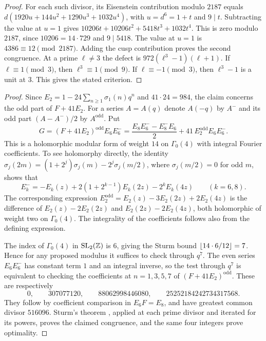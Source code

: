 \begin{proof}
For each such divisor, its Eisenstein contribution modulo $2187$ equals
$d(1920u+144u^2+1290u^3+1032u^4)$, with $u=d^6=1+t$ and $9\mid t$. Subtracting the value at
$u=1$ gives $10206t+10206t^2+5418t^3+1032t^4$. This is zero modulo $2187$, since
$10206=14\cdot729$ and $9\mid5418$. The value at $u=1$ is $4386\equiv12\pmod{2187}$.
Adding the cusp contribution proves the second congruence. At a prime $\ell\ne3$ the defect
is $972(\ell^3-1)(\ell+1)$. If $\ell\equiv1\pmod3$, then $\ell^3\equiv1\pmod9$. If
$\ell\equiv-1\pmod3$, then $\ell^3-1$ is a unit at $3$. This gives the stated criterion.
\end{proof}


\begin{proof}
Since $E_2=1-24\sum_{n\ge1}\sigma_1(n)q^n$ and $41\cdot24=984$, the claim concerns the odd
part of $F+41E_2$. For a series $A=A(q)$ denote $A(-q)$ by $A^-$ and its odd part $(A-A^-)/2$ by
$A^{\mathrm{odd}}$. Put
\[
 G=(F+41E_2)^{\mathrm{odd}}E_6E_6^-
 =\frac{E_8E_6^--E_8^-E_6}{2}+41\,E_2^{\mathrm{odd}}E_6E_6^- .
\]
This is a holomorphic modular form of weight $14$ on $\Gamma_0(4)$ with integral Fourier
coefficients. To see holomorphy directly, the identity
$\sigma_j(2m)=(1+2^j)\sigma_j(m)-2^j\sigma_j(m/2)$, where $\sigma_j(m/2)=0$ for odd $m$,
shows that
\[
 E_k^-=-E_k(z)+2(1+2^{k-1})E_k(2z)-2^kE_k(4z)\qquad(k=6,8).
\]
The corresponding expression $E_2^{\mathrm{odd}}=E_2(z)-3E_2(2z)+2E_2(4z)$ is the
difference of $E_2(z)-2E_2(2z)$ and $E_2(2z)-2E_2(4z)$, both holomorphic of weight two on
$\Gamma_0(4)$. The integrality of the coefficients follows also from the defining
expression.

The index of $\Gamma_0(4)$ in $\operatorname{SL}_2(\mathbb{Z})$ is $6$, giving the Sturm bound
$\lfloor14\cdot6/12\rfloor=7$. Hence for any proposed modulus it suffices to check through $q^7$.
The even series $E_6E_6^-$ has constant term $1$ and an integral inverse, so the test
through $q^7$ is equivalent to checking the coefficients at $n=1,3,5,7$ of
$(F+41E_2)^{\mathrm{odd}}$. These are respectively
\[
 0,\qquad307077120,\qquad88062998446080,\qquad25252184242734317568 .
\]
They follow by coefficient comparison in $E_6F=E_8$, and have greatest common divisor
$516096$. Sturm's theorem \cite{Sturm1987Congruence}, applied at each prime divisor and
iterated for its powers, proves the claimed congruence, and the same four integers prove
optimality.
\end{proof}

